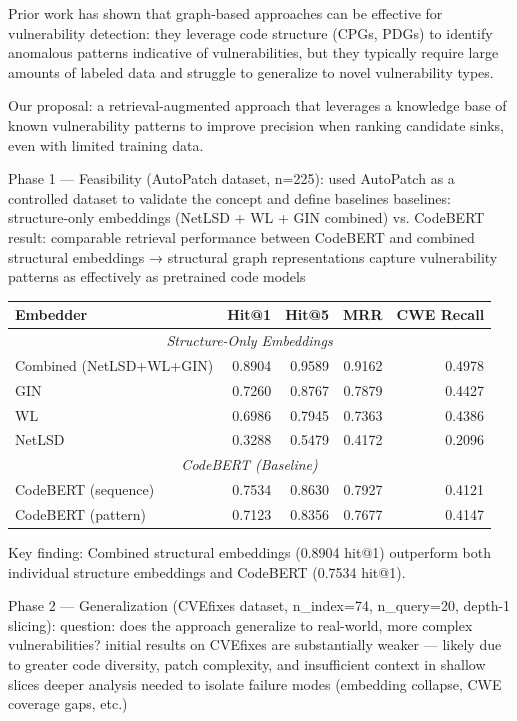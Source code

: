 Prior work has shown that graph-based approaches can be effective for vulnerability detection:
    they leverage code structure (CPGs, PDGs) to identify anomalous patterns indicative of vulnerabilities,
        but they typically require large amounts of labeled data and struggle to generalize to novel vulnerability types.

Our proposal: a retrieval-augmented approach that leverages a knowledge base of known vulnerability patterns
    to improve precision when ranking candidate sinks, even with limited training data.

Phase 1 — Feasibility (AutoPatch dataset, n=225):
    used AutoPatch as a controlled dataset to validate the concept and define baselines
    baselines: structure-only embeddings (NetLSD + WL + GIN combined) vs. CodeBERT
    result: comparable retrieval performance between CodeBERT and combined structural embeddings
        → structural graph representations capture vulnerability patterns as effectively as pretrained code models

    \begin{center}
    \begin{tabular}{|l|r|r|r|r|}
    \hline
    \textbf{Embedder} & \textbf{Hit@1} & \textbf{Hit@5} & \textbf{MRR} & \textbf{CWE Recall} \\
    \hline
    \hline
    \multicolumn{5}{|c|}{\textit{Structure-Only Embeddings}} \\
    \hline
    Combined (NetLSD+WL+GIN) & 0.8904 & 0.9589 & 0.9162 & 0.4978 \\
    GIN & 0.7260 & 0.8767 & 0.7879 & 0.4427 \\
    WL & 0.6986 & 0.7945 & 0.7363 & 0.4386 \\
    NetLSD & 0.3288 & 0.5479 & 0.4172 & 0.2096 \\
    \hline
    \multicolumn{5}{|c|}{\textit{CodeBERT (Baseline)}} \\
    \hline
    CodeBERT (sequence) & 0.7534 & 0.8630 & 0.7927 & 0.4121 \\
    CodeBERT (pattern) & 0.7123 & 0.8356 & 0.7677 & 0.4147 \\
    \hline
    \end{tabular}
    \end{center}

    Key finding: Combined structural embeddings (0.8904 hit@1) outperform both individual structure embeddings and CodeBERT (0.7534 hit@1).

Phase 2 — Generalization (CVEfixes dataset, n_index=74, n_query=20, depth-1 slicing):
    question: does the approach generalize to real-world, more complex vulnerabilities?
    initial results on CVEfixes are substantially weaker — likely due to greater code diversity, patch complexity, and insufficient context in shallow slices
    deeper analysis needed to isolate failure modes (embedding collapse, CWE coverage gaps, etc.)

